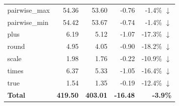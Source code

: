 \begin{table}[H]
\begin{tabular}{l r r r r}
  pairwise\_max & 54.36 & 53.60 & -0.76 & -1.4\% $\downarrow$ \\
  pairwise\_min & 54.42 & 53.67 & -0.74 & -1.4\% $\downarrow$ \\
  plus & 6.19 & 5.12 & -1.07 & -17.3\% $\downarrow$ \\
  round & 4.95 & 4.05 & -0.90 & -18.2\% $\downarrow$ \\
  scale & 1.98 & 1.76 & -0.22 & -10.9\% $\downarrow$ \\
  times & 6.37 & 5.33 & -1.05 & -16.4\% $\downarrow$ \\
  true & 1.54 & 1.35 & -0.19 & -12.4\% $\downarrow$ \\
\midrule
  \textbf{Total} & \textbf{419.50} & \textbf{403.01} & \textbf{-16.48} & \textbf{-3.9\%} \\
\bottomrule
\end{tabular}
\end{table}
